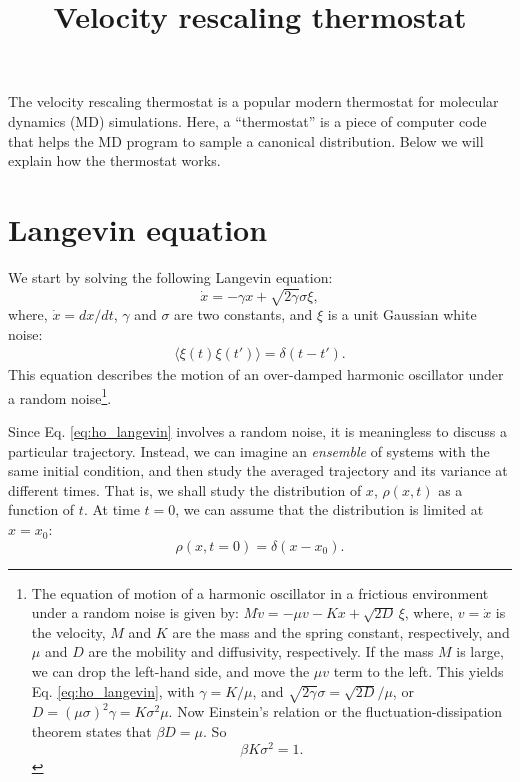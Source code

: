 \documentclass[11pt]{article}
\begin{document}
\title{ Velocity rescaling thermostat }
\author{ \vspace{-10ex} }
\date{ \vspace{-10ex} }
\maketitle



The velocity rescaling thermostat is a popular modern thermostat
for molecular dynamics (MD) simulations.
%
Here, a ``thermostat'' is a piece of computer code
that helps the MD program to sample a canonical distribution.
%
Below we will explain how the thermostat works.



\section{Langevin equation}



We start by solving the following Langevin equation:
%
\begin{equation}
  \dot x = -\gamma x + \sqrt{ 2 \gamma } \sigma \xi,
  \label{eq:ho_langevin}
\end{equation}
where,
$\dot x = dx/dt$,
$\gamma$ and $\sigma$ are two constants,
and $\xi$ is a unit Gaussian white noise:
\begin{align}
  \langle \xi(t) \xi(t') \rangle
=
  \delta(t - t').
\end{align}
This equation describes the motion of an over-damped harmonic oscillator
under a random noise\footnote{
%
%
%
The equation of motion of a harmonic oscillator
in a frictious environment
under a random noise is given by:
$M \dot v = -\mu v - K x + \sqrt{ 2 D } \, \xi$,
where, $v = \dot x$ is the velocity,
$M$ and $K$ are the mass and the spring constant, respectively,
and $\mu$ and $D$ are the mobility and diffusivity, respectively.
%
If the mass $M$ is large, we can drop the left-hand side,
and move the $\mu v$ term to the left.
%
This yields Eq. \eqref{eq:ho_langevin},
with $\gamma = K/\mu$,
and $\sqrt{2\gamma} \sigma = \sqrt{2 D}/\mu$,
%
or
$D = (\mu \sigma)^2 \gamma = K \sigma^2 \mu$.
%
Now Einstein's relation or the fluctuation-dissipation theorem
states that $\beta D = \mu$.
So
\begin{equation}
  \beta K \sigma^2 = 1.
  \label{eq:bKsig2}
\end{equation}
%
%
%
}.

Since Eq. \eqref{eq:ho_langevin} involves a random noise,
it is meaningless to discuss a particular trajectory.
%
Instead, we can imagine an \emph{ensemble} of systems
with the same initial condition,
and then study the averaged trajectory
and its variance at different times.
%
That is, we shall study the distribution
of $x$, $\rho(x, t)$ as a function of $t$.
%
At time $t = 0$, we can assume that the distribution
is limited at $x = x_0$:
%
\begin{equation}
  \rho(x, t = 0) = \delta(x - x_0).
  \label{eq:rho_t0}
\end{equation}
\end{document}
